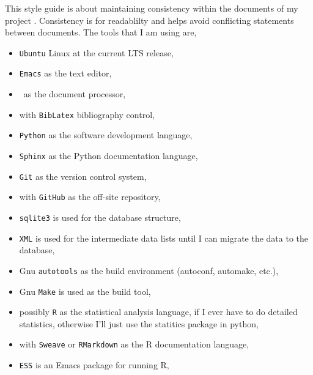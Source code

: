 This style guide is about maintaining consistency within the documents
of my project \ProjectTitle. Consistency is for readablilty and
helps avoid conflicting statements between documents. The tools
that I am using are,

\begin{itemize}
\item \texttt{Ubuntu} Linux at the current LTS release,
\item \texttt{Emacs} as the text editor,
\item \LaTeXe\ as the document processor,
\item with \texttt{BibLatex} bibliography control,
\item \texttt{Python} as the software development language,
\item \texttt{Sphinx} as the Python documentation language,
\item \texttt{Git} as the version control system,
\item with \texttt{GitHub} as the off-site repository,
\item \texttt{sqlite3} is used for the database structure,
\item \texttt{XML} is used for the intermediate data lists until
  I can migrate the data to the database,
\item Gnu \texttt{autotools} as the build environment (autoconf, automake,
  etc.),
\item Gnu \texttt{Make} is used as the build tool,
\item possibly \texttt{R} as the statistical analysis language,
  if I ever have to do detailed statistics, otherwise I'll just
  use the statitics package in python,
\item with \texttt{Sweave} or \texttt{RMarkdown} as the R documentation language,
\item \texttt{ESS} is an Emacs package for running R,
\end{itemize}
    

